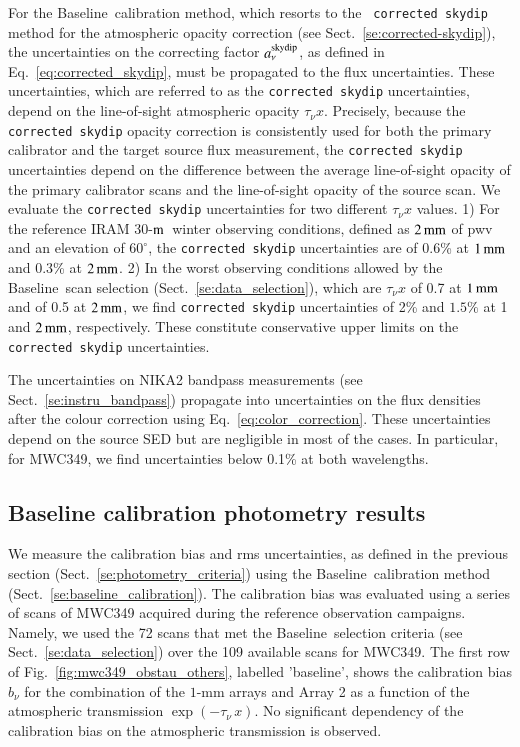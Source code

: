 \documentclass[traditionalabstract]{aa}
\newcommand{\trentemetre}{30-$\rm{m}$}
\newcommand{\baseline}{Baseline}%
\newcommand{\taunu}{\tau_{\nu}}
\begin{document}
{{For the \baseline\ calibration method, which resorts to the {\tt
corrected skydip} method for the atmospheric opacity correction (see
Sect.~\ref{se:corrected-skydip}), the uncertainties on the
correcting factor $a_\nu^{\rm{skydip}}$, as defined in
Eq.~\ref{eq:corrected_skydip}, must be propagated to the flux
uncertainties. These uncertainties, which are referred to as the
{\tt corrected skydip} uncertainties, depend on the line-of-sight atmospheric
opacity $\taunu x$. Precisely, because the {\tt corrected skydip}
opacity correction is consistently used for both the primary
calibrator and the target source flux measurement, the {\tt corrected skydip}
uncertainties depend on the difference between the average
line-of-sight opacity of the primary calibrator scans and the
line-of-sight opacity of the source scan.   
We evaluate the {\tt corrected skydip} uncertainties for two
different $\taunu x$ values. 1) For the reference IRAM \trentemetre\
winter observing conditions, defined as $2\,\rm{mm}$ of pwv and an
elevation of $60^{\circ}$, the {\tt corrected skydip} uncertainties are of
0.6\% at $1\,\rm{mm}$ and 0.3\% at $2\,\rm{mm}$. 2) In the worst
observing conditions allowed by the \baseline\ scan selection
(Sect.~\ref{se:data_selection}),
which are $\taunu x$ of 0.7 at $1\,\rm{mm}$ and of 0.5 at
$2\,\rm{mm}$, we find {\tt corrected skydip} uncertainties of 2\% and
$1.5\%$ at 1 and $2\,\rm{mm}$, respectively. These constitute
conservative upper limits on the {\tt corrected skydip}
uncertainties.

The uncertainties on NIKA2 bandpass measurements (see
Sect.~\ref{se:instru_bandpass}) propagate into
uncertainties on the flux densities after the colour correction using
Eq.~\ref{eq:color_correction}. These
uncertainties depend on the source SED but are negligible in most of
the cases. In particular, for MWC349, we find uncertainties below 0.1\% at
both wavelengths.}


\subsection{Baseline calibration photometry results}
\label{se:photometry_baseline}

We measure the calibration bias and rms uncertainties, as defined
in the previous section (Sect.~\ref{se:photometry_criteria}) using the
\baseline\ calibration method (Sect.~\ref{se:baseline_calibration}).
The calibration bias was evaluated using a
series of scans of MWC349 acquired during the
 reference observation campaigns. Namely, we used the 72 scans that met
 the \baseline\ selection
 criteria (see Sect.~\ref{se:data_selection}) over the 109 available
scans for MWC349. The first row of
Fig.~\ref{fig:mwc349_obstau_others}, labelled 'baseline', shows the
calibration bias $b_{\nu}$ for the combination of the $1$-mm arrays and
Array 2 as a function of the atmospheric transmission 
$\exp \left( - \taunu \, x \right)$. No significant dependency of the
calibration bias on the atmospheric transmission is observed. 

}
\end{document}
